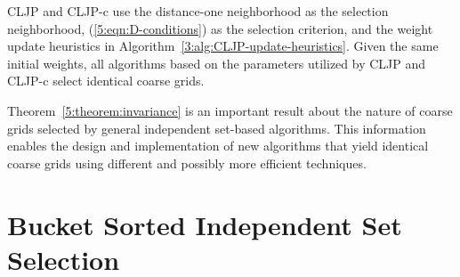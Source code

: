 \documentclass{elsart}
\begin{document}
\begin{rem}
CLJP and CLJP-c use the distance-one neighborhood as the selection
neighborhood, (\ref{5:eqn:D-conditions}) as the selection criterion,
and the weight update heuristics in
Algorithm~\ref{3:alg:CLJP-update-heuristics}. Given the same initial
weights, all algorithms based on the parameters utilized by CLJP and
CLJP-c select identical coarse grids.
\end{rem}

Theorem~\ref{5:theorem:invariance} is an important result about the
nature of coarse grids selected by general independent set-based
algorithms. This information enables the design and implementation of
new algorithms that yield identical coarse grids using different and
possibly more efficient techniques.

\section{Bucket Sorted Independent Set Selection}
\label{5:sec:contribution}
\end{document}
